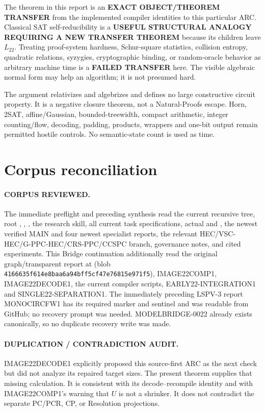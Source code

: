 \documentclass[11pt]{article}
\begin{document}
The theorem in this report is an \textbf{EXACT OBJECT/THEOREM TRANSFER} from
the implemented compiler identities to this particular ARC.  Classical SAT
self-reducibility is a \textbf{USEFUL STRUCTURAL ANALOGY REQUIRING A NEW
TRANSFER THEOREM} because its children leave $L_{22}$.  Treating proof-system
hardness, Schur-square statistics, collision entropy, quadratic relations,
syzygies, cryptographic binding, or random-oracle behavior as arbitrary
machine time is a \textbf{FAILED TRANSFER} here.  The visible algebraic
normal form may help an algorithm; it is not presumed hard.

The argument relativizes and algebrizes and defines no large constructive
circuit property.  It is a negative closure theorem, not a Natural-Proofs
escape.  Horn, 2SAT, affine/Gaussian, bounded-treewidth, compact arithmetic,
integer counting/flow, decoding, padding, products, wrappers and one-bit
output remain permitted hostile controls.  No semantic-state count is used
as time.

\section{Corpus reconciliation}
\paragraph{CORPUS REVIEWED.}
The immediate preflight and preceding synthesis read the current recursive
tree, root , , , the research
skill, all current task specifications, actual  and
, the newest verified MAIN and four newest specialist
reports, the relevant HEC/VSC-HEC/G-PPC-HEC/CRS-PPC/CCSPC branch, governance
notes, and cited experiments.  This Bridge continuation additionally read
the original graph/transparent report at
(blob \texttt{4166635f614e8baa6a94bff5cf47e76815e971f5}), IMAGE22COMP1,
IMAGE22DECODE1, the current compiler scripts, EARLY22-INTEGRATION1 and
SINGLE22-SEPARATION1.  The immediately preceding LSPV-3 report
MONOCIRCFW1 has its required marker and sentinel and was readable from
GitHub; no recovery prompt was needed.  MODELBRIDGE-0022 already exists
canonically, so no duplicate recovery write was made.

\paragraph{DUPLICATION / CONTRADICTION AUDIT.}
IMAGE22DECODE1 explicitly proposed this source-first ARC as the next check but
did not analyze its repaired target sizes.  The present theorem supplies
that missing calculation.  It is consistent with its decode--recompile
identity and with IMAGE22COMP1's warning that $U$ is not a shrinker.  It does
not contradict the separate PC/PCR, CP, or Resolution projections.
\end{document}
